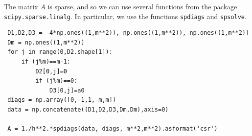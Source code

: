  The matrix $A$ is sparse, and so we can use several functions from the package \texttt{scipy.sparse.linalg}. In particular, we use the functions \texttt{spdiags} and \texttt{spsolve}.
 
 
 
 
 \begin{verbatim}
 D1,D2,D3 = -4*np.ones((1,m**2)), np.ones((1,m**2)), np.ones((1,m**2)) 
 Dm = np.ones((1,m**2))
 for j in range(0,D2.shape[1]):
     if (j%m)==m-1:
         D2[0,j]=0
         if (j%m)==0:
             D3[0,j]=a0
 diags = np.array([0,-1,1,-m,m])
 data = np.concatenate((D1,D2,D3,Dm,Dm),axis=0)
 
 A = 1./h**2.*spdiags(data, diags, m**2,m**2).asformat('csr') 
 \end{verbatim}
 

